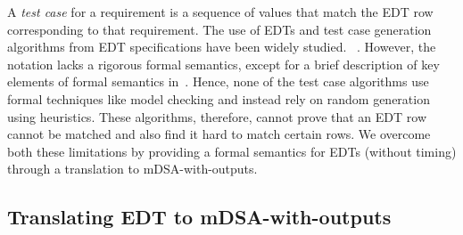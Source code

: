 

A \emph{test case} for a requirement is a sequence of values  that match the
EDT row corresponding to that requirement. The use of EDTs and test case generation
algorithms from EDT specifications have been widely studied.
~\cite{DBLP:conf/enase/VenkateshSZA15a,DBLP:conf/icst/AgrawalVSZV20}. However, the notation lacks a rigorous
formal semantics, except for a brief description of key elements of formal
semantics in~\cite{DBLP:conf/date/VenkateshSKA14}. Hence, none of the test case algorithms use
formal techniques like model checking and instead rely on random generation
using heuristics. These algorithms, therefore, cannot prove that an EDT row
cannot be matched and also find it hard to match certain rows. We overcome both
these limitations by providing a formal semantics for EDTs (without timing)
through a translation to mDSA-with-outputs.

\subsection{Translating EDT to mDSA-with-outputs}

